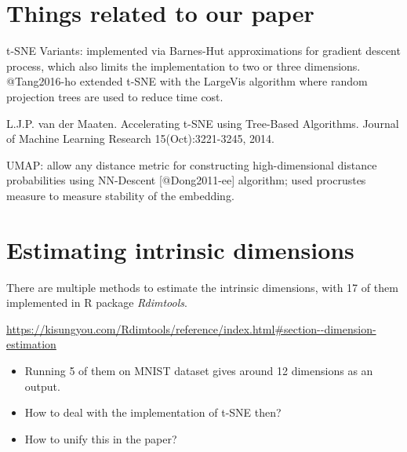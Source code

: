 \documentclass[
]{article}
\begin{document}
\hypertarget{things-related-to-our-paper}{%
\section{Things related to our paper}\label{things-related-to-our-paper}}

t-SNE Variants: implemented via Barnes-Hut approximations for gradient descent process, which also limits the implementation to two or three dimensions. @Tang2016-ho extended t-SNE with the LargeVis algorithm where random projection trees are used to reduce time cost.

L.J.P. van der Maaten. Accelerating t-SNE using Tree-Based Algorithms. Journal of Machine Learning Research 15(Oct):3221-3245, 2014.

UMAP: allow any distance metric for constructing high-dimensional distance probabilities using NN-Descent {[}@Dong2011-ee{]} algorithm; used procrustes measure to measure stability of the embedding.

\hypertarget{estimating-intrinsic-dimensions}{%
\section{Estimating intrinsic dimensions}\label{estimating-intrinsic-dimensions}}

There are multiple methods to estimate the intrinsic dimensions, with 17 of them implemented in R package \emph{Rdimtools}.

\url{https://kisungyou.com/Rdimtools/reference/index.html\#section--dimension-estimation}

\begin{itemize}
\item
  Running 5 of them on MNIST dataset gives around 12 dimensions as an output.
\item
  How to deal with the implementation of t-SNE then?
\item
  How to unify this in the paper?
\end{itemize}
\end{document}
